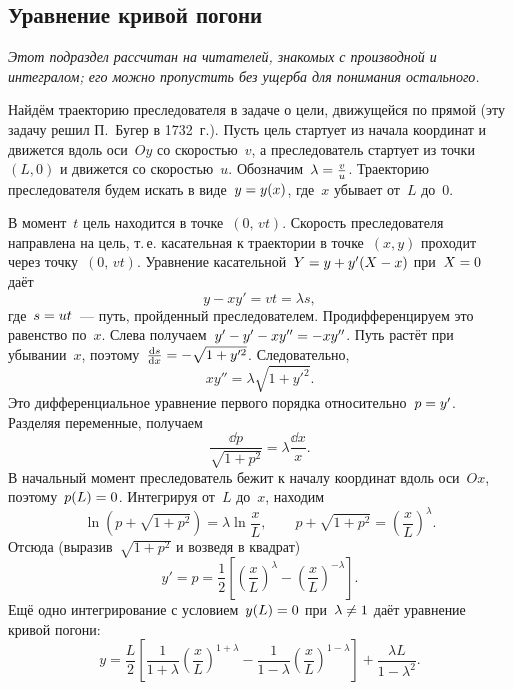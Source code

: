 \documentclass[../main.tex]{subfiles}
\begin{document}
\subsection{Уравнение кривой погони}\label{sec:pur_curve}

\textit{Этот подраздел рассчитан на читателей, знакомых с производной и интегралом;
его можно пропустить без ущерба для понимания остального.}

Найдём траекторию преследователя в задаче о цели, движущейся по прямой (эту задачу
решил П.~Бугер в 1732~г.). Пусть цель стартует из начала координат и движется вдоль
оси~$Oy$ со скоростью~$v$, а преследователь стартует из точки~$(L, 0)$ и движется со
скоростью~$u$. Обозначим~$\lambda \hm= \frac{v}{u}$. Траекторию преследователя будем
искать в виде~$y \hm= y(x)$, где~$x$ убывает от~$L$ до~$0$.

В момент~$t$ цель находится в точке~$(0,\, vt)$. Скорость преследователя направлена
на цель, т.\,е. касательная к траектории в точке~$(x, y)$ проходит через точку~$(0,\, vt)$. Уравнение касательной~$Y \hm= y + y'(X - x)$ при~$X \hm= 0$ даёт
\[
y - xy' = vt = \lambda s,
\]
где~$s \hm= ut$~--- путь, пройденный преследователем. Продифференцируем это равенство
по~$x$. Слева получаем~$y' - y' - xy'' \hm= -xy''$. Путь растёт при убывании~$x$,
поэтому~$\frac{\dd{s}}{\dd{x}} \hm= -\sqrt{1 + y'^2}$. Следовательно,
\[
xy'' = \lambda\sqrt{1 + y'^2}.
\]
Это дифференциальное уравнение первого порядка относительно~$p \hm= y'$. Разделяя
переменные, получаем
\[
\frac{\dd{p}}{\sqrt{1 + p^2}} = \lambda\frac{\dd{x}}{x}.
\]
В начальный момент преследователь бежит к началу координат вдоль оси~$Ox$, поэтому~$p(L) \hm= 0$. Интегрируя от~$L$ до~$x$, находим
\[
\ln\left(p + \sqrt{1 + p^2}\right) = \lambda\ln\frac{x}{L},
\qquad
p + \sqrt{1 + p^2} = \left(\frac{x}{L}\right)^{\lambda}.
\]
Отсюда (выразив~$\sqrt{1 + p^2}$ и возведя в квадрат)
\[
y' = p = \frac{1}{2}\left[\left(\frac{x}{L}\right)^{\lambda} - \left(\frac{x}{L}\right)^{-\lambda}\right].
\]
Ещё одно интегрирование с условием~$y(L) \hm= 0$ при~$\lambda \hm\neq 1$ даёт уравнение
кривой погони:
\[
y = \frac{L}{2}\left[\frac{1}{1 + \lambda}\left(\frac{x}{L}\right)^{1 + \lambda}
- \frac{1}{1 - \lambda}\left(\frac{x}{L}\right)^{1 - \lambda}\right]
+ \frac{\lambda L}{1 - \lambda^2}.
\]

\end{document}
